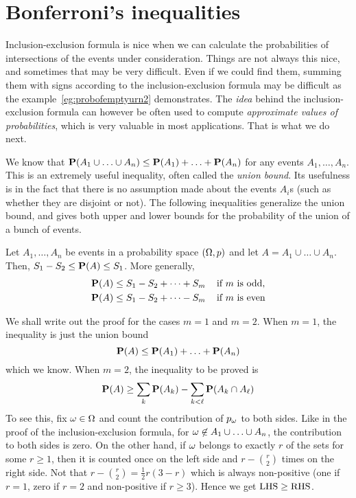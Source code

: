 \documentclass[preprint,  11pt]{amsart}
\begin{document}
\section{Bonferroni's inequalities}
Inclusion-exclusion formula is nice when we can calculate the probabilities of intersections of the events under consideration. Things are not always this nice, and sometimes that may be very difficult. Even if we could find them, summing them with signs according to the inclusion-exclusion formula may be difficult as the example~\ref{eg:probofemptyurn2} demonstrates. The {\em idea} behind the inclusion-exclusion formula can however be often used to compute {\em approximate values of probabilities}, which is very valuable in most applications. That is what we do next.


We know that $\P(A_{1}\cup \ldots \cup A_{n})\le \P(A_{1})+\ldots +\P(A_{n})$ for any events $A_{1},\ldots ,A_{n}$. This is an extremely useful inequality, often called the {\em union bound}. Its usefulness is in the fact that there is no assumption made about the events $A_{i}$s (such as whether they are disjoint or not). The following inequalities generalize the union bound, and gives both upper and lower bounds for the probability of the union of a bunch of events.

\begin{lemma}\label{lem:Bonferroni's inequalities} Let $A_{1},\ldots, A_{n}$ be events in a probability space $(\Ome,p)$ and let $A=A_{1}\cup \ldots \cup A_{n}$. Then, $S_1-S_2\le \P(A)\le S_1$. More generally,
\begin{align*}
\P(A) &\le S_1-S_2+\dots +S_m \;\;\; \mb{ if $m$ is odd}, \\
\P(A) &\le S_1-S_2+\dots -S_m \;\;\; \mb{ if $m$ is even} 
\end{align*}
\end{lemma}
\bprf We shall write out the proof for the cases $m=1$ and $m=2$. When $m=1$, the inequality is just the union bound
$$
 \P(A)\le \P(A_{1})+\ldots +\P(A_{n})
$$
which we know. When $m=2$, the inequality to be proved is
$$
\P(A)\ge \sum_{k}\P(A_{k})-\sum_{k<\ell}\P(A_{k}\cap A_{\ell})
$$
To see this, fix $\ome\in \Ome$ and count the contribution of $p_{\ome}$ to both sides. Like in the proof of the inclusion-exclusion formula, for $\ome \not\in A_{1}\cup\ldots \cup A_{n}$, the contribution to both sides is zero. On the other hand, if $\ome$ belongs to exactly $r$ of the sets for some $r\ge 1$, then it is counted once on the left side and $r-\binom{r}{2}$ times on the right side. Not that $r-\binom{r}{2} = \frac{1}{2}r(3-r)$ which is always non-positive (one if $r=1$, zero if $r=2$ and non-positive if $r\ge 3$). Hence we get $\mb{LHS}\ge \mb{RHS}$.
\end{document}
